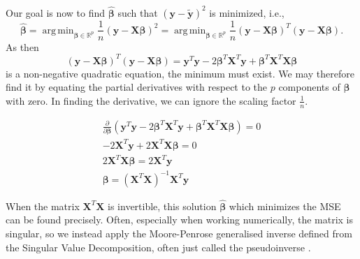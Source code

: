 \documentclass{article}
\DeclareMathOperator*{\argmin}{arg\,min}
\begin{document}
Our goal is now to find $\boldsymbol{\hat{\beta}}$ such that $\left( \boldsymbol{y} - \boldsymbol{\tilde{y}} \right)^2$ is minimized, i.e.,
\begin{equation*}
    \boldsymbol{\hat{\beta}}  = \argmin_{\boldsymbol{\beta} \in \mathbb{R}^p} \frac{1}{n} \left( \boldsymbol{y} - \textbf{X} \boldsymbol{\beta} \right)^2 = \argmin_{\boldsymbol{\beta} \in \mathbb{R}^p} \frac{1}{n} \left( \boldsymbol{y} - \textbf{X} \boldsymbol{\beta} \right)^T \left( \boldsymbol{y} - \textbf{X} \boldsymbol{\beta} \right).
\end{equation*}
As then
\begin{equation*}
    \left( \boldsymbol{y} - \textbf{X} \boldsymbol{\beta} \right)^T \left( \boldsymbol{y} - \textbf{X} \boldsymbol{\beta} \right) = \boldsymbol{y}^T \boldsymbol{y} - 2 \boldsymbol{\beta}^T \textbf{X}^T \boldsymbol{y} + \boldsymbol{\beta}^T \textbf{X}^T \textbf{X} \boldsymbol{\beta} 
\end{equation*}
is a non-negative quadratic equation, the minimum must exist. We may therefore find it by equating the partial derivatives with respect to the $p$ components of $\boldsymbol{\beta}$ with zero. In finding the derivative, we can ignore the scaling factor $\frac{1}{n}$.

\begin{gather*}
    \frac{\partial}{\partial \boldsymbol{\beta}} \left( \boldsymbol{y}^T \boldsymbol{y} - 2 \boldsymbol{\beta}^T \textbf{X}^T \boldsymbol{y} + \boldsymbol{\beta}^T \textbf{X}^T \textbf{X} \boldsymbol{\beta} \right) = 0 \\
    -2 \textbf{X}^T \boldsymbol{y} + 2 \textbf{X}^T \boldsymbol{X \beta} = 0 \\
    2 \textbf{X}^T \boldsymbol{X \beta} = 2 \textbf{X}^T \boldsymbol{y} \\
    \boldsymbol{\beta} = \left( \textbf{X}^T \textbf{X} \right)^{-1} \textbf{X}^T \boldsymbol{y}
\end{gather*}

When the matrix $\textbf{X}^T \textbf{X}$ is invertible, this solution $\boldsymbol{\hat{\beta}}$ which minimizes the MSE can be found precisely. Often, especially when working numerically, the matrix is singular, so we instead apply the Moore-Penrose generalised inverse defined from the Singular Value Decomposition, often just called the pseudoinverse \cite[p.~74--82]{introNumeric}.
\end{document}

